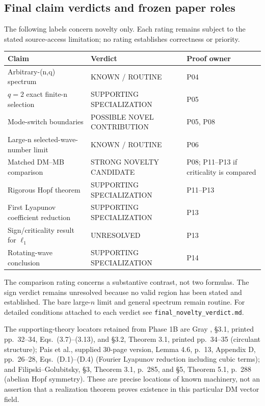 \subsection{Final claim verdicts and frozen paper roles}
The following labels concern novelty only. Each rating remains subject to the
stated source-access limitation; no rating establishes correctness or priority.
\begin{longtable}{>{\raggedright\arraybackslash}p{}>{\raggedright\arraybackslash}p{}>{\raggedright\arraybackslash}p{}}
\toprule Claim & Verdict & Proof owner \\ \midrule\endhead
Arbitrary-(n,q) spectrum & KNOWN / ROUTINE & P04 \\
$q=2$ exact finite-n selection & SUPPORTING SPECIALIZATION & P05 \\
Mode-switch boundaries & POSSIBLE NOVEL CONTRIBUTION & P05, P08 \\
Large-n selected-wave-number limit & KNOWN / ROUTINE & P06 \\
Matched DM--MB comparison & STRONG NOVELTY CANDIDATE & P08; P11--P13 if criticality is compared \\
Rigorous Hopf theorem & SUPPORTING SPECIALIZATION & P11--P13 \\
First Lyapunov coefficient reduction & SUPPORTING SPECIALIZATION & P13 \\
Sign/criticality result for $\ell_1$ & UNRESOLVED & P13 \\
Rotating-wave conclusion & SUPPORTING SPECIALIZATION & P14 \\
\bottomrule\end{longtable}
The comparison rating concerns a substantive contrast, not two formulas.
The sign verdict remains unresolved because no valid region has been stated
and established. The bare large-$n$ limit and general spectrum remain routine.
For detailed conditions attached to each verdict see
\texttt{final\_novelty\_verdict.md}.

The supporting-theory locators retained from Phase 1B are Gray
\cite{Gray2006}, \S3.1, printed pp.~32--34, Eqs.~(3.7)--(3.13),
and \S3.2, Theorem 3.1, printed pp.~34--35 (circulant structure);
Pais et al.\cite{PaisCaicedoLeonard2012}, supplied 30-page version,
Lemma 4.6, p.~13, Appendix D, pp.~26--28, Eqs.~(D.1)--(D.4)
(Fourier Lyapunov reduction including cubic terms); and
Filipski--Golubitsky\cite{FilipskiGolubitsky2010}, \S3, Theorem 3.1,
p.~285, and \S5, Theorem 5.1, p.~288 (abelian Hopf symmetry).
These are precise locations of known machinery, not an assertion that a
realization theorem proves existence in this particular DM vector field.


